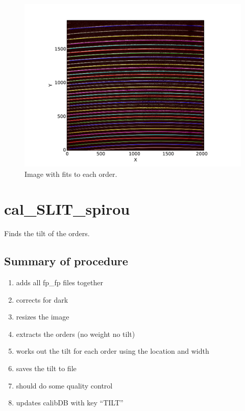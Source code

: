\begin{figure}
\begin{center}
\includegraphics[width=.8\textwidth]{figures/cal_loc_RAW_spirou_2.pdf}
\caption{Image with fits to each order. \label{figure:cal_loc_RAW_spirou_2}}
\end{center}
\end{figure}



\clearpage
\newpage
\section{cal\_SLIT\_spirou}
\label{section:cal_SLIT_spirou}

Finds the tilt of the orders. \\


\subsection{Summary of procedure}
\begin{enumerate}
\item adds all fp\_fp files together
\item corrects for dark
\item resizes the image
\item extracts the orders (no weight no tilt)
\item works out the tilt for each order using the location and width
\item saves the tilt to file
\item should do some quality control
\item  updates calibDB with key ``TILT''
\end{enumerate}

